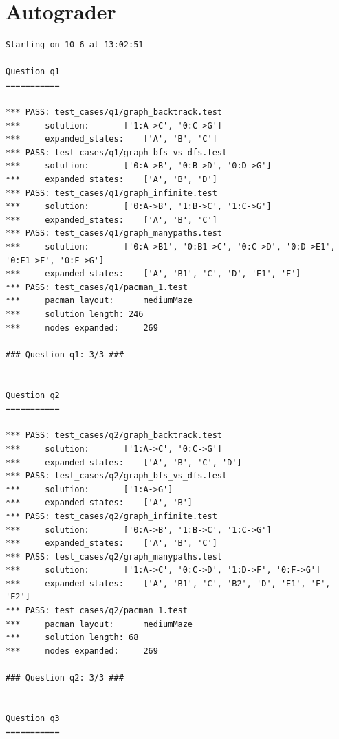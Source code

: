 \documentclass{report}
\begin{document}
      \section{Autograder}
          \begin{lstlisting}
Starting on 10-6 at 13:02:51

Question q1
===========

*** PASS: test_cases/q1/graph_backtrack.test
*** 	solution:		['1:A->C', '0:C->G']
*** 	expanded_states:	['A', 'B', 'C']
*** PASS: test_cases/q1/graph_bfs_vs_dfs.test
*** 	solution:		['0:A->B', '0:B->D', '0:D->G']
*** 	expanded_states:	['A', 'B', 'D']
*** PASS: test_cases/q1/graph_infinite.test
*** 	solution:		['0:A->B', '1:B->C', '1:C->G']
*** 	expanded_states:	['A', 'B', 'C']
*** PASS: test_cases/q1/graph_manypaths.test
*** 	solution:		['0:A->B1', '0:B1->C', '0:C->D', '0:D->E1', '0:E1->F', '0:F->G']
*** 	expanded_states:	['A', 'B1', 'C', 'D', 'E1', 'F']
*** PASS: test_cases/q1/pacman_1.test
*** 	pacman layout:		mediumMaze
*** 	solution length: 246
*** 	nodes expanded:		269

### Question q1: 3/3 ###


Question q2
===========

*** PASS: test_cases/q2/graph_backtrack.test
*** 	solution:		['1:A->C', '0:C->G']
*** 	expanded_states:	['A', 'B', 'C', 'D']
*** PASS: test_cases/q2/graph_bfs_vs_dfs.test
*** 	solution:		['1:A->G']
*** 	expanded_states:	['A', 'B']
*** PASS: test_cases/q2/graph_infinite.test
*** 	solution:		['0:A->B', '1:B->C', '1:C->G']
*** 	expanded_states:	['A', 'B', 'C']
*** PASS: test_cases/q2/graph_manypaths.test
*** 	solution:		['1:A->C', '0:C->D', '1:D->F', '0:F->G']
*** 	expanded_states:	['A', 'B1', 'C', 'B2', 'D', 'E1', 'F', 'E2']
*** PASS: test_cases/q2/pacman_1.test
*** 	pacman layout:		mediumMaze
*** 	solution length: 68
*** 	nodes expanded:		269

### Question q2: 3/3 ###


Question q3
===========


\end{lstlisting}
\end{document}
